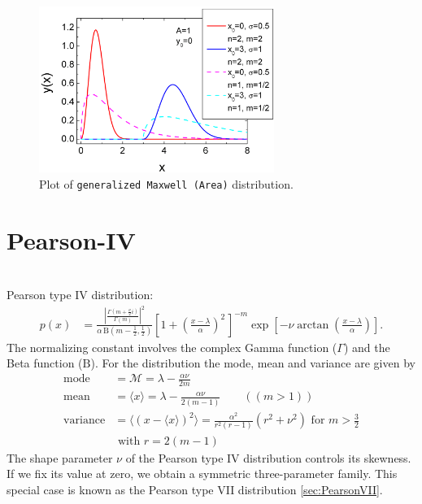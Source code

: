 \begin{figure}[htb]
\begin{center}
\includegraphics[width=0.6824\textwidth]{generalizedMaxwellArea.png}
\end{center}
\caption{Plot of \texttt{generalized Maxwell (Area)}
distribution.} \label{fig:generalizedMaxwellArea}
\end{figure}



\clearpage
\section{Pearson-IV} ~\\
\label{sec:PearsonIV}
 Pearson type IV distribution:
\begin{align}
    p(x) &= \frac{\left|\frac{\Gamma\!\left(m+\frac{\nu}{2}i\right)}{\Gamma(m)}\right|^2} {\alpha\,\mathrm{B}\!\left(m-\frac12, \frac12\right)} \left[1 + \left(\frac{x-\lambda}{\alpha}\right)^{\!2\,} \right]^{-m} \exp\left[-\nu \arctan\left(\frac{x-\lambda}{\alpha}\right)\right]. \!
\end{align}
The normalizing constant involves the complex Gamma function ($\Gamma$) and the Beta function ($\mathrm{B}$).
For the distribution the mode, mean and variance are given by
\begin{align}
\mathrm{mode} &= \mathcal{M} = \lambda-\frac{\alpha\nu}{2m} \\
\mathrm{mean} &= \langle x \rangle = \lambda-\frac{\alpha\nu}{2(m-1)} \qquad ((m>1)) \\
\mathrm{variance} &= \langle (x-\langle x \rangle)^2 \rangle = \frac{\alpha^2}{r^2(r-1)} \left(r^2+\nu^2 \right)\mbox{ for } m>\frac{3}{2} \\
& \mbox{ with } r=2(m-1) \nonumber
\end{align}
The shape parameter $\nu$ of the Pearson type IV distribution controls its skewness. If we fix its value at zero, we obtain a symmetric three-parameter family. This special case is known as the Pearson type VII distribution \ref{sec:PearsonVII}.
